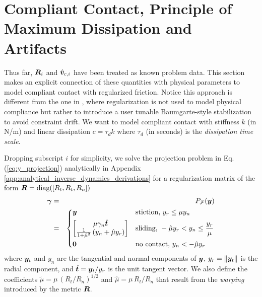 \section{Compliant Contact, Principle of Maximum Dissipation and Artifacts}
\label{sec:physical_intuition}

Thus far, ${\bm{R}}_i$ and $\hat{{\bm{v}}}_{c,i}$ have been treated as known problem
data. This section makes an explicit connection of these quantities with
physical parameters to model compliant contact with regularized friction. Notice
this approach is different from the one in \cite{bib:todorov2014}, where
regularization is not used to model physical compliance but rather to introduce
a user tunable Baumgarte-style stabilization to avoid constraint drift. We want
to model compliant contact with stiffness $k$ (in N/m) and linear
dissipation $c = \tau_d k$ where $\tau_d$ (in seconds) is the \textit{dissipation
time scale}. 

Dropping subscript $i$ for simplicity, we solve the projection problem in Eq.
(\ref{eq:y_projection}) analytically in Appendix
\ref{app:analytical_inverse_dynamics_derivations} for a regularization matrix of
the form ${\bm{R}} = \text{diag}([R_t, R_t, R_n])$
\begin{eqnarray}
	\bgamma &=& P_\mathcal{F}(\vf{y})
    \label{eq:analytical_y_projection}\\
    &=&\begin{dcases}
	\vf{y} 
	& \text{stiction, } y_r \le \mu y_n\\
	\begin{bmatrix}
		\mu\gamma_n\hat{\vf{t}}\\
		\frac{1}{1+\tilde\mu^2}\left(y_n +
        \hat\mu y_r\right)
	\end{bmatrix}
	& \text{sliding, } -\hat\mu y_r < y_n \leq \frac{y_r}{\mu}\\
    \vf{0} & \text{no contact, } y_n < -\hat\mu y_r
\end{dcases}\nonumber	
\end{eqnarray}
where ${\bm{y}}_t$ and $y_n$ are the tangential and normal components of ${\bm{y}}$,
$y_r=\Vert{\bm{y}}_t\Vert$ is the radial component, and $\hat{{\bm{t}}}={\bm{y}}_t/y_r$
is the unit tangent vector. We also define the coefficients
$\tilde\mu=\mu\,(R_t/R_n)^{1/2}$ and $\hat\mu=\mu\,R_t/R_n$ that
result from the \textit{warping} introduced by the metric ${\bm{R}}$.

